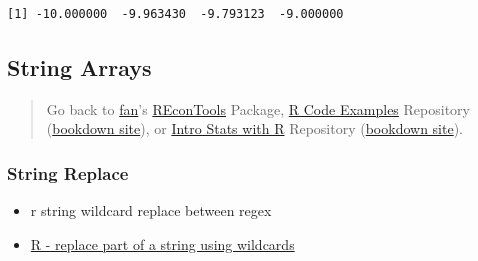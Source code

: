 \documentclass[
]{book}
\newenvironment{Shaded}{\begin{snugshade}}{\end{snugshade}}
\newcommand{\CharTok}[1]{\textcolor[rgb]{0.31,0.60,0.02}{#1}}
\newcommand{\CommentTok}[1]{\textcolor[rgb]{0.56,0.35,0.01}{\textit{#1}}}
\newcommand{\DataTypeTok}[1]{\textcolor[rgb]{0.13,0.29,0.53}{#1}}
\newcommand{\KeywordTok}[1]{\textcolor[rgb]{0.13,0.29,0.53}{\textbf{#1}}}
\newcommand{\NormalTok}[1]{#1}
\newcommand{\OperatorTok}[1]{\textcolor[rgb]{0.81,0.36,0.00}{\textbf{#1}}}
\newcommand{\StringTok}[1]{\textcolor[rgb]{0.31,0.60,0.02}{#1}}
\providecommand{\tightlist}{%
  \setlength{\itemsep}{0pt}\setlength{\parskip}{0pt}}
\begin{document}
\begin{verbatim}
[1] -10.000000  -9.963430  -9.793123  -9.000000
\end{verbatim}

\hypertarget{string-arrays}{%
\subsection{String Arrays}\label{string-arrays}}

\begin{quote}
Go back to \href{http://fanwangecon.github.io/}{fan}'s \href{https://fanwangecon.github.io/REconTools/}{REconTools} Package, \href{https://fanwangecon.github.io/R4Econ/}{R Code Examples} Repository (\href{https://fanwangecon.github.io/R4Econ/bookdown}{bookdown site}), or \href{https://fanwangecon.github.io/Stat4Econ/}{Intro Stats with R} Repository (\href{https://fanwangecon.github.io/Stat4Econ/bookdown}{bookdown site}).
\end{quote}

\hypertarget{string-replace}{%
\subsubsection{String Replace}\label{string-replace}}

\begin{itemize}
\tightlist
\item
  r string wildcard replace between regex
\item
  \href{https://stackoverflow.com/a/27246520/8280804}{R - replace part of a string using wildcards}
\end{itemize}

\begin{Shaded}
\end{Shaded}
\end{document}
